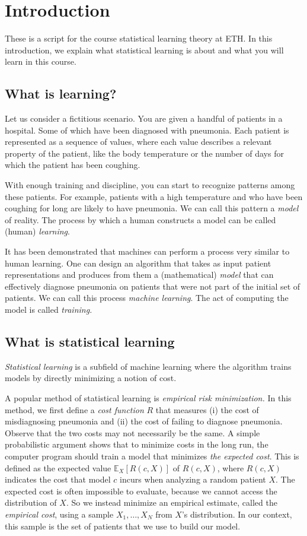 \chapter*{Introduction}

These is a script for the course statistical learning theory at ETH. In this introduction, we explain what statistical learning is about and what you will learn in this course.

\section*{What is learning?}

Let us consider a fictitious scenario. You are given a handful of patients
in a hospital. Some of which have been diagnosed with pneumonia. Each
patient is represented as a sequence of values, where each value describes a
relevant property of the patient, like the body temperature or the number
of days for which the patient has been coughing.

With enough training and discipline, you can start to recognize patterns
among these patients. For example, patients with a high temperature and
who have been coughing for long are likely to have pneumonia. We can call this pattern a \emph{model} of reality. The process by which a human constructs a model can be called (human) \emph{learning}.

It has been demonstrated that machines can perform a process very
similar to human learning. One can design an algorithm that takes as
input patient representations and produces from them a (mathematical) \emph{model} that can
effectively diagnose pneumonia on patients that were not part of the initial
set of patients. We can call this process \emph{machine learning}. The act of
computing the model is called \emph{training.}

\section*{What is statistical learning}

\emph{Statistical learning} is a subfield of machine learning where the algorithm
trains models by directly minimizing a notion of cost.

A popular method of statistical learning is \emph{empirical risk minimization.}
In this method, we first define a \emph{cost function} $R$ that measures (i) the
cost of misdiagnosing pneumonia and (ii) the cost of failing to diagnose
pneumonia. Observe that the two costs may not necessarily be the same.
A simple probabilistic argument shows that to minimize costs in the
long run, the computer program should train a model that minimizes \emph{the
expected cost}. This is defined as the expected value $\mathbb{E}_X\left[R(c, X)\right]$ of $R(c,X)$,
where $R(c, X)$ indicates the cost that model $c$ incurs when analyzing a
random patient $X$.
The expected cost is often impossible to evaluate, because we cannot
access the distribution of $X$. So we instead minimize an empirical estimate, called the \emph{empirical cost}, using a sample $X_1, \ldots, X_N$ from $X$'s distribution. In our context, this sample is the set of patients that we use
to build our model.

